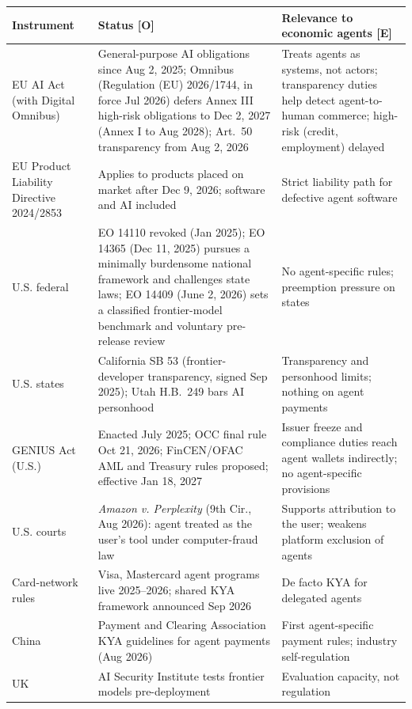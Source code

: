 \documentclass[11pt,letterpaper]{article}
\begin{document}
{\small
\setlength{\LTleft}{0pt}\setlength{\LTright}{0pt}
\begin{longtable}{L{3.1cm}L{7.0cm}L{5.8cm}}
\toprule
\textbf{Instrument} & \textbf{Status [O]} & \textbf{Relevance to economic agents [E]} \\
\midrule
\endhead
EU AI Act (with Digital Omnibus) & General-purpose AI obligations since Aug 2, 2025; Omnibus (Regulation (EU) 2026/1744, in force Jul 2026) defers Annex III high-risk obligations to Dec 2, 2027 (Annex I to Aug 2028); Art.~50 transparency from Aug 2, 2026 & Treats agents as systems, not actors; transparency duties help detect agent-to-human commerce; high-risk (credit, employment) delayed \\
EU Product Liability Directive 2024/2853 & Applies to products placed on market after Dec 9, 2026; software and AI included & Strict liability path for defective agent software \\
U.S. federal & EO 14110 revoked (Jan 2025); EO 14365 (Dec 11, 2025) pursues a minimally burdensome national framework and challenges state laws; EO 14409 (June 2, 2026) sets a classified frontier-model benchmark and voluntary pre-release review & No agent-specific rules; preemption pressure on states \\
U.S. states & California SB 53 (frontier-developer transparency, signed Sep 2025); Utah H.B.~249 bars AI personhood & Transparency and personhood limits; nothing on agent payments \\
GENIUS Act (U.S.) & Enacted July 2025; OCC final rule Oct 21, 2026; FinCEN/OFAC AML and Treasury rules proposed; effective Jan 18, 2027 & Issuer freeze and compliance duties reach agent wallets indirectly; no agent-specific provisions \\
U.S. courts & \textit{Amazon v. Perplexity} (9th Cir., Aug 2026): agent treated as the user's tool under computer-fraud law & Supports attribution to the user; weakens platform exclusion of agents \\
Card-network rules & Visa, Mastercard agent programs live 2025--2026; shared KYA framework announced Sep 2026 & De facto KYA for delegated agents \\
China & Payment and Clearing Association KYA guidelines for agent payments (Aug 2026) & First agent-specific payment rules; industry self-regulation \\
UK & AI Security Institute tests frontier models pre-deployment & Evaluation capacity, not regulation \\
\bottomrule
\end{longtable}
}
\end{document}
